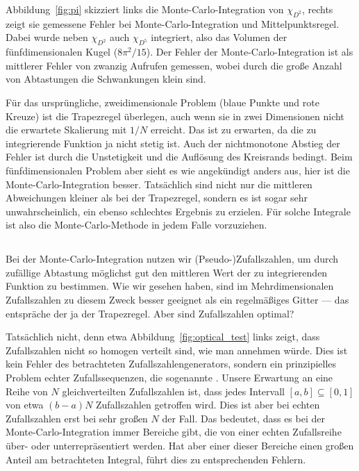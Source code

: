 Abbildung~\ref{fig:pi} skizziert links die Monte-Carlo-Integration von
$\chi_{D^2}$, rechts zeigt sie gemessene Fehler bei
Monte-Carlo-Integration und Mittelpunktsregel. Dabei wurde neben
$\chi_{D^2}$ auch $\chi_{D^5}$ integriert, also das Volumen der
fünfdimensionalen Kugel ($8\pi^2/15$). Der Fehler der
Monte-Carlo-Integration ist als mittlerer Fehler von zwanzig Aufrufen
gemessen, wobei durch die große Anzahl von Abtastungen die
Schwankungen klein sind.

Für das ursprüngliche, zweidimensionale Problem (blaue Punkte und rote
Kreuze) ist die Trapezregel überlegen, auch wenn sie in zwei
Dimensionen nicht die erwartete Skalierung mit $1/N$ erreicht. Das ist
zu erwarten, da die zu integrierende Funktion ja nicht stetig
ist. Auch der nichtmonotone Abstieg der Fehler ist durch die
Unstetigkeit und die Auflösung des Kreisrands bedingt. Beim
fünfdimensionalen Problem aber sieht es wie angekündigt anders aus,
hier ist die Monte-Carlo-Integration besser. Tatsächlich sind nicht
nur die mittleren Abweichungen kleiner als bei der Trapezregel,
sondern es ist sogar sehr unwahrscheinlich, ein ebenso schlechtes
Ergebnis zu erzielen. Für solche Integrale ist also die
Monte-Carlo-Methode in jedem Falle vorzuziehen.

\subsection{}

Bei der Monte-Carlo-Integration nutzen wir (Pseudo-)Zufallszahlen, um
durch zufällige Abtastung möglichst gut den mittleren Wert der zu
integrierenden Funktion zu bestimmen. Wie wir gesehen haben, sind im
Mehrdimensionalen Zufallszahlen zu diesem Zweck besser geeignet als
ein regelmäßiges Gitter --- das entspräche der ja der
Trapezregel. Aber sind Zufallszahlen optimal?

Tatsächlich nicht, denn etwa Abbildung~\ref{fig:optical_test} links
zeigt, dass Zufallszahlen nicht so homogen verteilt sind, wie man
annehmen würde. Dies ist kein Fehler des betrachteten
Zufallszahlengenerators, sondern ein prinzipielles Problem echter
Zufallssequenzen, die sogenannte \emph{}. Unsere
Erwartung an eine Reihe von $N$ gleichverteilten Zufallszahlen ist,
dass jedes Intervall $[a,b]\subseteq [0,1]$ von etwa $(b-a)N$
Zufallszahlen getroffen wird. Dies ist aber bei echten Zufallszahlen
erst bei sehr großen $N$ der Fall. Das bedeutet, dass es bei der
Monte-Carlo-Integration immer Bereiche gibt, die von einer echten
Zufallsreihe über- oder unterrepräsentiert werden. Hat aber einer
dieser Bereiche einen großen Anteil am betrachteten Integral, führt
dies zu entsprechenden Fehlern.

